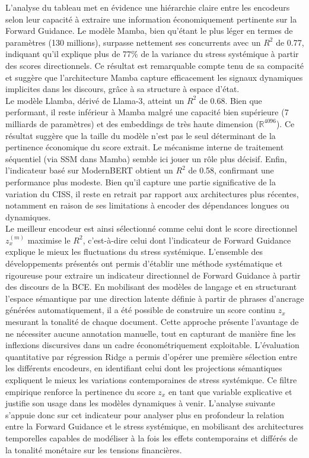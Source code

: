 L’analyse du tableau met en évidence une hiérarchie claire entre les encodeurs selon leur capacité à extraire une information économiquement pertinente sur la Forward Guidance. Le modèle Mamba, bien qu’étant le plus léger en termes de paramètres (130 millions), surpasse nettement ses concurrents avec un $R^2$ de 0.77, indiquant qu’il explique plus de 77\% de la variance du stress systémique à partir des scores directionnels. Ce résultat est remarquable compte tenu de sa compacité et suggère que l’architecture Mamba capture efficacement les signaux dynamiques implicites dans les discours, grâce à sa structure à espace d’état.\\

Le modèle Llamba, dérivé de Llama-3, atteint un $R^2$ de 0.68. Bien que performant, il reste inférieur à Mamba malgré une capacité bien supérieure (7 milliards de paramètres) et des embeddings de très haute dimension ($\mathbb{R}^{4096}$). Ce résultat suggère que la taille du modèle n’est pas le seul déterminant de la pertinence économique du score extrait. Le mécanisme interne de traitement séquentiel (via SSM dans Mamba) semble ici jouer un rôle plus décisif. Enfin, l’indicateur basé sur ModernBERT obtient un $R^2$ de 0.58, confirmant une performance plus modeste. Bien qu’il capture une partie significative de la variation du CISS, il reste en retrait par rapport aux architectures plus récentes, notamment en raison de ses limitations à encoder des dépendances longues ou dynamiques.\\

Le meilleur encodeur est ainsi sélectionné comme celui dont le score directionnel $z_x^{(m)}$ maximise le $R^2$, c’est-à-dire celui dont l’indicateur de Forward Guidance explique le mieux les fluctuations du stress systémique. L’ensemble des développements présentés ont permis d’établir une méthode systématique et rigoureuse pour extraire un indicateur directionnel de Forward Guidance à partir des discours de la BCE. En mobilisant des modèles de langage et en structurant l’espace sémantique par une direction latente définie à partir de phrases d’ancrage générées automatiquement, il a été possible de construire un score continu $z_x$ mesurant la tonalité de chaque document. Cette approche présente l’avantage de ne nécessiter aucune annotation manuelle, tout en capturant de manière fine les inflexions discursives dans un cadre économétriquement exploitable. L’évaluation quantitative par régression Ridge a permis d’opérer une première sélection entre les différents encodeurs, en identifiant celui dont les projections sémantiques expliquent le mieux les variations contemporaines de stress systémique. Ce filtre empirique renforce la pertinence du score $z_x$ en tant que variable explicative et justifie son usage dans les modèles dynamiques à venir. L'analyse suivante s’appuie donc sur cet indicateur pour analyser plus en profondeur la relation entre la Forward Guidance et le stress systémique, en mobilisant des architectures temporelles capables de modéliser à la fois les effets contemporains et différés de la tonalité monétaire sur les tensions financières.

